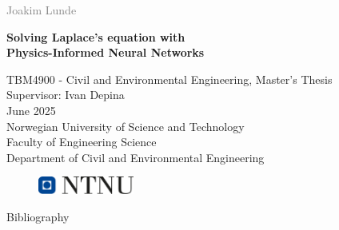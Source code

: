 \documentclass[a4paper, 12pt,twoside,fleqn]{book}
\begin{document}

\begin{titlepage}
  \vspace*{1.5cm}

  \noindent  \textcolor{gray}{\large Joakim Lunde} \\
  \vspace{1cm}

  \noindent \textbf{\LARGE Solving Laplace's equation with\\ Physics-Informed Neural Networks \\}

  \vfill  %

  \noindent TBM4900 - Civil and Environmental Engineering, Master's Thesis \\
  Supervisor: Ivan Depina \\
  June 2025 \\

  \vspace{0.8cm}
  \noindent
  Norwegian University of Science and Technology \\
  Faculty of Engineering Science \\
  Department of Civil and Environmental Engineering \\
  \vspace{0.8cm}

  \begin{figure}[h]
    \includegraphics[width=0.28\textwidth]{Figures/ntnu_basic.png}
  \end{figure}
\end{titlepage}





\tableofcontents
{}

\listoffigures
{}

\listoftables
{}

\printglossary[title=Glossary, toctitle=Glossary]


\cleardoublepage
{}
 









{\protect\numberline{}Bibliography}
\chapter*{\bibname}
\printbibliography[heading=none]
\cleardoublepage

% 
\end{document}
